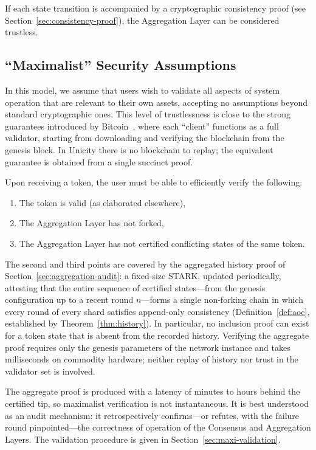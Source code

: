 \documentclass[11pt]{article}
\begin{document}
If each state transition is accompanied by a cryptographic consistency proof (see Section~\ref{sec:consistency-proof}), the Aggregation Layer can be considered trustless.


\subsection{``Maximalist'' Security Assumptions}
\label{sec:maximalist}

In this model, we assume that users wish to validate all aspects of system operation that are relevant to their own assets, accepting no assumptions beyond standard cryptographic ones. This level of trustlessness is close to the strong guarantees introduced by Bitcoin~\cite{bitcoin}, where each ``client'' functions as a full validator, starting from downloading and verifying the blockchain from the genesis block. In Unicity there is no blockchain to replay; the equivalent guarantee is obtained from a single succinct proof.

Upon receiving a token, the user must be able to efficiently verify the following:

\begin{enumerate}[nosep]
    \item The token is valid (as elaborated elsewhere),
    \item The Aggregation Layer has not forked,
    \item The Aggregation Layer has not certified conflicting states of the same token.
\end{enumerate}

The second and third points are covered by the aggregated history proof of Section~\ref{sec:aggregation-audit}: a fixed-size STARK, updated periodically, attesting that the entire sequence of certified states---from the genesis configuration up to a recent round $n$---forms a single non-forking chain in which every round of every shard satisfies append-only consistency (Definition~\ref{def:aoc}, established by Theorem~\ref{thm:history}). In particular, no inclusion proof can exist for a token state that is absent from the recorded history. Verifying the aggregate proof requires only the genesis parameters of the network instance and takes milliseconds on commodity hardware; neither replay of history nor trust in the validator set is involved.

The aggregate proof is produced with a latency of minutes to hours behind the certified tip, so maximalist verification is not instantaneous. It is best understood as an audit mechanism: it retrospectively confirms---or refutes, with the failure round pinpointed---the correctness of operation of the Consensus and Aggregation Layers. The validation procedure is given in Section~\ref{sec:maxi-validation}.
\end{document}
